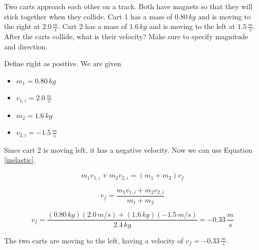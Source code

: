 \documentclass[12pt]{book}
\begin{document}
\begin{exampleblock}

Two carts approach each other on a track. Both have magnets so that they will stick together when they collide. Cart 1 has a mass of $0.80 \, kg$ and is moving to the right at $2.0 \, \frac{m}{s}$. Cart 2 has a mass of $1.6 \, kg$ and is moving to the left at $1.5 \, \frac{m}{s}$. After the carts collide, what is their velocity? Make sure to specify magnitude and direction.

\hspace{10pt}

Define right as positive. We are given

\begin{itemize}
\item $m_1 = 0.80 \, kg$
\item $v_{1,i} = 2.0 \, \frac{m}{s}$
\item $m_2 = 1.6 \, kg$
\item $v_{2,i} = -1.5 \, \frac{m}{s}$
\end{itemize}

Since cart 2 is moving left, it has a negative velocity. Now we can use Equation \ref{inelastic}.

\begin{equation}
m_1 v_{1,i} + m_2 v_{2,i} = (m_1 + m_2) v_f
\end{equation}

\begin{equation}
v_f = \frac{m_1 v_{1,i} + m_2 v_{2,i}}{m_1 + m_2}
\end{equation}

\begin{equation}
v_f = \frac{(0.80 \, kg)(2.0 \, m/s) + (1.6 \, kg)(-1.5 \, m/s)}{2.4 \, kg} = -0.33 \, \frac{m}{s}
\end{equation}

The two carts are moving to the left, having a velocity of $v_f = -0.33 \, \frac{m}{s}$.

\end{exampleblock}
\end{document}
